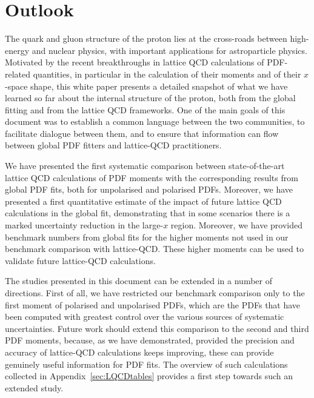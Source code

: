 \section{Outlook}
\label{sec:outlook}

The quark and gluon structure of the proton lies
at the cross-roads between high-energy and nuclear physics, with important
applications for astroparticle physics.
%
Motivated by the recent breakthroughs in lattice QCD calculations of
PDF-related quantities, in particular in the calculation of their moments and of
their $x$-space shape, this white paper presents a detailed snapshot of what we have learned so far
about the internal structure of the proton, both from the global fitting and from
the lattice QCD frameworks.
%
One of the main goals of this document was to establish a common language
between the two communities, to facilitate dialogue between them,
and to ensure that information can flow between global PDF fitters
and lattice-QCD practitioners.
%

We have presented the first systematic
comparison between state-of-the-art lattice QCD calculations of PDF moments with
the corresponding results from global PDF fits, both
for unpolarised and polarised PDFs.
%
Moreover, we have presented a first quantitative estimate of the impact
of future lattice QCD calculations in the global fit, demonstrating that
in some scenarios there is a marked uncertainty reduction in the large-$x$ region.
%
Moreover, we have provided benchmark numbers
from global fits for the higher moments not used
in our benchmark comparison with lattice-QCD. These higher moments can be used
to validate future lattice-QCD calculations.

The studies presented in this document can be extended in a number of directions.
%
First of all, we have restricted our benchmark comparison only to the
first moment of polarised and unpolarised PDFs, which are the PDFs
that have been computed with greatest control over the various sources of
systematic uncertainties.
%
Future work should extend this comparison to the second and third PDF moments,
because, as we have demonstrated, provided the precision and accuracy
of lattice-QCD calculations keeps improving, these can provide genuinely
useful information for PDF fits.
%
The overview of such calculations collected in Appendix~\ref{sec:LQCDtables}
provides a first step towards such an extended study.

